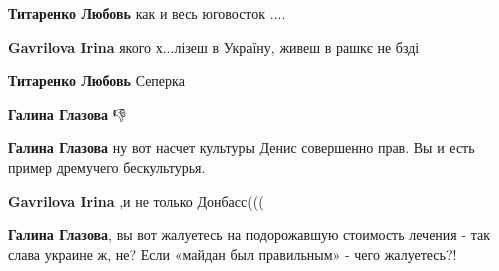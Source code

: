 \begin{itemize}
\begin{itemize}
\textbf{Титаренко Любовь} как и весь юговосток ....

 
\textbf{Gavrilova Irina} якого х...лізеш в Україну, живеш в рашкє не бзді

 
\textbf{Титаренко Любовь} Сеперка

 
\textbf{Галина Глазова} 👎

 
\textbf{Галина Глазова} ну вот насчет культуры Денис совершенно прав. Вы и есть пример дремучего бескультурья.

 
\textbf{Gavrilova Irina} ,и не только Донбасс(((

 
\textbf{Галина Глазова}, вы вот жалуетесь на подорожавшую стоимость лечения -
так слава украине ж, не? Если «майдан был правильным» - чего жалуетесь?!
\end{itemize}


\end{itemize}
